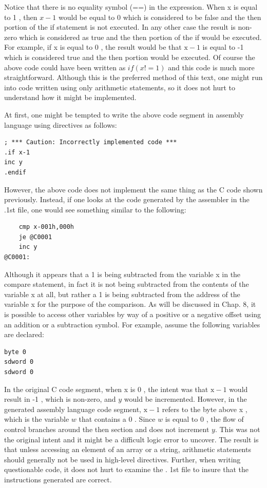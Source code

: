 \documentclass[10pt]{book}
\begin{document}
Notice that there is no equality symbol (==) in the expression. When x is equal to 1 , then $x-1$ would be equal to 0 which is considered to be false and the then portion of the if statement is not executed. In any other case the result is non-zero which is considered as true and the then portion of the if would be executed. For example, if x is equal to 0 , the result would be that $\mathrm{x}-1$ is equal to -1 which is considered true and the then portion would be executed. Of course the above code could have been written as $i f(x!=1)$ and this code is much more straightforward. Although this is the preferred method of this text, one might run into code written using only arithmetic statements, so it does not hurt to understand how it might be implemented.

At first, one might be tempted to write the above code segment in assembly language using directives as follows:

\begin{verbatim}
; *** Caution: Incorrectly implemented code ***
.if x-1
inc y
.endif
\end{verbatim}

However, the above code does not implement the same thing as the C code shown previously. Instead, if one looks at the code generated by the assembler in the .1st file, one would see something similar to the following:

\begin{verbatim}
    cmp x-001h,000h
    je @C0001
    inc y
@C0001:
\end{verbatim}

Although it appears that a 1 is being subtracted from the variable x in the compare statement, in fact it is not being subtracted from the contents of the variable x at all, but rather a 1 is being subtracted from the address of the variable x for the purpose of the comparison. As will be discussed in Chap. 8, it is possible to access other variables by way of a positive or a negative offset using an addition or a subtraction symbol. For example, assume the following variables are declared:

\begin{verbatim}
byte 0
sdword 0
sdword 0
\end{verbatim}

In the original C code segment, when x is 0 , the intent was that $\mathrm{x}-1$ would result in -1 , which is non-zero, and $y$ would be incremented. However, in the generated assembly language code segment, $\mathrm{x}-1$ refers to the byte above x , which is the variable $w$ that contains a 0 . Since $w$ is equal to 0 , the flow of control branches around the then section and does not increment $y$. This was not the original intent and it might be a difficult logic error to uncover. The result is that unless accessing an element of an array or a string, arithmetic statements should generally not be used in high-level directives. Further, when writing questionable code, it does not hurt to examine the . 1st file to insure that the instructions generated are correct.
\end{document}
